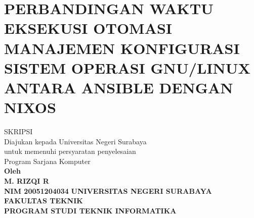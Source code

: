 \documentclass[10pt,]{report}
\begin{document}

\shipout\null
{}
\chapter*{PERBANDINGAN WAKTU EKSEKUSI OTOMASI MANAJEMEN
  KONFIGURASI SISTEM OPERASI GNU/LINUX ANTARA ANSIBLE DENGAN NIXOS}
\begin{center}
	\vspace{1cm}
	SKRIPSI \\
	\medskip
	Diajukan kepada Universitas Negeri Surabaya\\
	\medskip
	untuk memenuhi persyaratan penyelesaian\\
	\medskip
	Program Sarjana Komputer\\
	\vfill
	\textbf{Oleh \\
		\medskip
		M. RIZQI R \\
		\medskip
		NIM 20051204034}
	\vfill
	\textbf{UNIVERSITAS NEGERI SURABAYA\\
		\medskip
		FAKULTAS TEKNIK\\
		\medskip
		PROGRAM STUDI TEKNIK INFORMATIKA\\
		}
\end{center}
\end{document}
